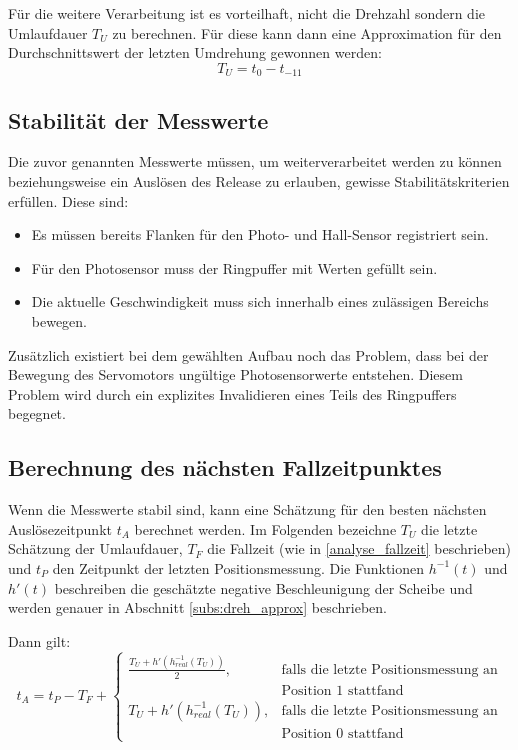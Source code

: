 Für die weitere Verarbeitung ist es vorteilhaft, nicht die Drehzahl sondern die Umlaufdauer $T_U$ zu berechnen.
Für diese kann dann eine Approximation für den Durchschnittswert der letzten Umdrehung gewonnen werden:
\begin{equation*}
T_U = t_0 - t_{-11}
\end{equation*}

\subsection{Stabilität der Messwerte}\label{design_stabilitaet}
Die zuvor genannten Messwerte müssen, um weiterverarbeitet werden zu können beziehungsweise ein Auslösen des Release zu erlauben, gewisse Stabilitätskriterien erfüllen.
Diese sind:
\begin{itemize}
	\item Es müssen bereits Flanken für den Photo- und Hall-Sensor registriert sein.
	\item Für den Photosensor muss der Ringpuffer mit Werten gefüllt sein.
	\item Die aktuelle Geschwindigkeit muss sich innerhalb eines zulässigen Bereichs bewegen.
\end{itemize}

Zusätzlich existiert bei dem gewählten Aufbau noch das Problem, dass bei der Bewegung des Servomotors ungültige Photosensorwerte entstehen.
Diesem Problem wird durch ein explizites Invalidieren eines Teils des Ringpuffers begegnet.

\subsection{Berechnung des nächsten Fallzeitpunktes}\label{design_zeitpunkt}
Wenn die Messwerte stabil sind, kann eine Schätzung für den besten nächsten Auslösezeitpunkt $t_A$ berechnet werden.
Im Folgenden bezeichne $T_U$ die letzte Schätzung der Umlaufdauer, $T_F$ die Fallzeit (wie in \cref{analyse_fallzeit} beschrieben) und $t_P$ den Zeitpunkt der letzten Positionsmessung.
Die Funktionen $h^{-1}(t)$ und $h'(t)$ beschreiben die geschätzte negative Beschleunigung der Scheibe und werden genauer in Abschnitt \ref{subs:dreh_approx} beschrieben.

Dann gilt:
\begin{equation*}
t_A = t_P - T_F +
\begin{cases}
	\frac{T_U + h'(h^{-1}_{real}(T_U))}{2} , & \text{falls die letzte Positionsmessung an}\\
	&  \text{Position 1 stattfand}\\
	T_U + h'(h^{-1}_{real}(T_U)), & \text{falls die letzte Positionsmessung an}\\
	&  \text{Position 0 stattfand}
\end{cases}
\end{equation*}


